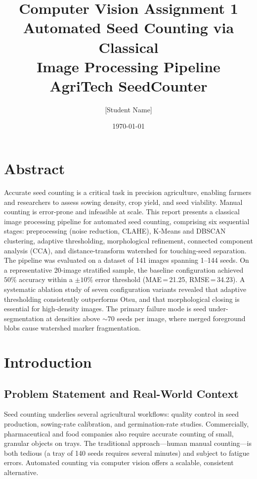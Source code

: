 \documentclass[12pt,a4paper]{article}
\title{
    \large Computer Vision Assignment 1\\[0.4em]
    \LARGE \textbf{Automated Seed Counting via Classical\\Image Processing Pipeline}\\[0.4em]
    \large AgriTech SeedCounter
}
\author{[Student Name]}
\date{\today}
\begin{document}
\maketitle
\tableofcontents
\newpage

\section*{Abstract}

Accurate seed counting is a critical task in precision agriculture, enabling
farmers and researchers to assess sowing density, crop yield, and seed
viability. Manual counting is error-prone and infeasible at scale. This report
presents a classical image processing pipeline for automated seed counting,
comprising six sequential stages: preprocessing (noise reduction, CLAHE),
K-Means and DBSCAN clustering, adaptive thresholding, morphological
refinement, connected component analysis (CCA), and distance-transform
watershed for touching-seed separation. The pipeline was evaluated on a
dataset of 141 images spanning 1–144 seeds. On a representative 20-image
stratified sample, the baseline configuration achieved $50\%$ accuracy within
a $\pm 10\%$ error threshold (MAE\,=\,21.25, RMSE\,=\,34.23). A systematic
ablation study of seven configuration variants revealed that adaptive
thresholding consistently outperforms Otsu, and that morphological closing is
essential for high-density images. The primary failure mode is seed
under-segmentation at densities above \(\sim\!70\) seeds per image, where
merged foreground blobs cause watershed marker fragmentation.

\newpage

\section{Introduction}

\subsection{Problem Statement and Real-World Context}

Seed counting underlies several agricultural workflows: quality control in
seed production, sowing-rate calibration, and germination-rate studies.
Commercially, pharmaceutical and food companies also require accurate counting
of small, granular objects on trays. The traditional approach---human manual
counting---is both tedious (a tray of 140 seeds requires several minutes) and
subject to fatigue errors. Automated counting via computer vision offers a
scalable, consistent alternative.
\end{document}
